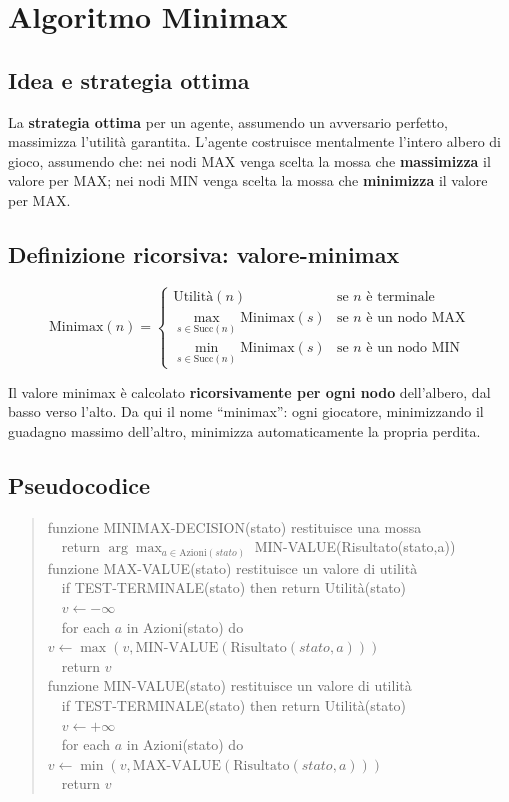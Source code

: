 \documentclass[11pt,a4paper]{report}
\begin{document}
\section{Algoritmo Minimax}

\subsection*{Idea e strategia ottima}

La \textbf{strategia ottima} per un agente, assumendo un avversario perfetto, massimizza l'utilità garantita. L'agente costruisce mentalmente l'intero albero di gioco, assumendo che: nei nodi MAX venga scelta la mossa che \textbf{massimizza} il valore per MAX; nei nodi MIN venga scelta la mossa che \textbf{minimizza} il valore per MAX.

\subsection*{Definizione ricorsiva: valore-minimax}

\[
\text{Minimax}(n) =
\begin{cases}
\text{Utilità}(n) & \text{se } n \text{ è terminale}\\
\max_{s \in \text{Succ}(n)} \text{Minimax}(s) & \text{se } n \text{ è un nodo MAX}\\
\min_{s \in \text{Succ}(n)} \text{Minimax}(s) & \text{se } n \text{ è un nodo MIN}
\end{cases}
\]

Il valore minimax è calcolato \textbf{ricorsivamente per ogni nodo} dell'albero, dal basso verso l'alto. Da qui il nome ``minimax'': ogni giocatore, minimizzando il guadagno massimo dell'altro, minimizza automaticamente la propria perdita.

\subsection*{Pseudocodice}

\begin{quote}
\ttfamily
funzione MINIMAX-DECISION(stato) restituisce una mossa\\
\ \ return $\arg\max_{a\in\text{Azioni}(stato)}$ MIN-VALUE(Risultato(stato,a))\\[4pt]
funzione MAX-VALUE(stato) restituisce un valore di utilità\\
\ \ if TEST-TERMINALE(stato) then return Utilità(stato)\\
\ \ $v \leftarrow -\infty$\\
\ \ for each $a$ in Azioni(stato) do $v \leftarrow \max(v, \text{MIN-VALUE}(\text{Risultato}(stato,a)))$\\
\ \ return $v$\\[4pt]
funzione MIN-VALUE(stato) restituisce un valore di utilità\\
\ \ if TEST-TERMINALE(stato) then return Utilità(stato)\\
\ \ $v \leftarrow +\infty$\\
\ \ for each $a$ in Azioni(stato) do $v \leftarrow \min(v, \text{MAX-VALUE}(\text{Risultato}(stato,a)))$\\
\ \ return $v$
\end{quote}
\end{document}
